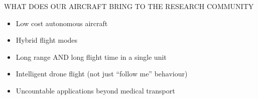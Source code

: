 \color{red}
WHAT DOES OUR AIRCRAFT BRING TO THE RESEARCH COMMUNITY
\begin{itemize}
	\item Low cost autonomous aircraft
	\item Hybrid flight modes
	\item Long range AND long flight time in a single unit
	\item Intelligent drone flight (not just ``follow me'' behaviour)
	\item Uncountable applications beyond medical transport
\end{itemize}